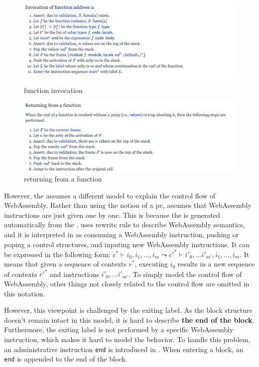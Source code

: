\begin{figure}[h!]
    \centerline{\includegraphics[width=15cm]{fig/invoke}}
    \caption[Enter the caption title here]{function invocation} \label{fig:invoke}
    \centerline{\includegraphics[width=15cm]{fig/returning}}
    \caption[Enter the caption title here]{returning from a function} \label{fig:returning}
\end{figure}


However, the \spectecp{} assumes a different model to explain the control flow
of WebAssembly.
Rather than using the notion of a pc, \spectecp{} assumes that WebAssembly
instructions are just given one by one.
This is because the \spectecp{} is generated automatically from the
.
 uses rewrite rule to describe WebAssembly semantics, and it
is interpreted in \spectecp{} as consuming a WebAssembly instruction, pushing
or poping a control structures, and inputing new WebAssembly instructions.
It can be expressed in the following form:
$c^* \vdash i_0, i_1, ..., i_m \leadsto c'^* \vdash i'_0, ...i'_{m'}, i_1, ..., i_m$.
It means that given a sequence of contexts $c^*$, executing $i_0$ results in a
new sequence of contexts $c'^*$ and instructions $i'_0, ...i'_{m'}$.
To simply model the control flow of WebAssembly, other things not closely
related to the control flow are omitted in this notation.


However, this viewpoint is challenged by the exiting label.
As the block structure doesn't remain intact in this model, it is hard to
describe \textbf{the end of the block}.
Furthermore, the exiting label is not performed by a specific WebAssembly
instruction, which makes it hard to model the behavior.
To handle this problem, an administrative instruction \texttt{end} is
introduced in \spectecp.
When entering a block, an \texttt{end} is appended to the end of the block.


